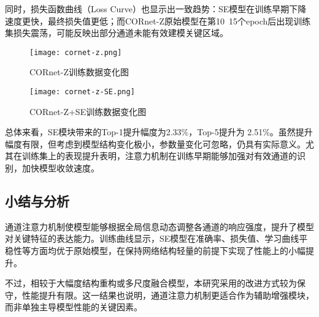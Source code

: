 同时，损失函数曲线（Loss Curve）也显示出一致趋势：SE模型在训练早期下降速度更快，最终损失值更低；而CORnet-Z原始模型在第10~15个epoch后出现训练集损失震荡，可能反映出部分通道未能有效建模关键区域。


\begin{figure}[hbt]
	\centering
	\texttt{[image: cornet-z.png]}
	\caption{CORnet-Z训练数据变化图}
	\label{f.zzxt}
\end{figure}

\begin{figure}[hbt]
	\centering
	\texttt{[image: cornet-z-SE.png]}
	\caption{CORnet-Z+SE训练数据变化图}
	\label{f.zsezxt}
\end{figure}

总体来看，SE模块带来的Top-1提升幅度为2.33\%，Top-5提升为 2.51\%。虽然提升幅度有限，但考虑到模型结构变化极小，参数量变化可忽略，仍具有实际意义。尤其在训练集上的表现提升表明，注意力机制在训练早期能够加强对有效通道的识别，加快模型收敛速度。

\subsection{小结与分析}

通道注意力机制使模型能够根据全局信息动态调整各通道的响应强度，提升了模型对关键特征的表达能力。训练曲线显示，SE模型在准确率、损失值、学习曲线平稳性等方面均优于原始模型，在保持网络结构轻量的前提下实现了性能上的小幅提升。

不过，相较于大幅度结构重构或多尺度融合模型，本研究采用的改进方式较为保守，性能提升有限。这一结果也说明，通道注意力机制更适合作为辅助增强模块，而非单独主导模型性能的关键因素。
